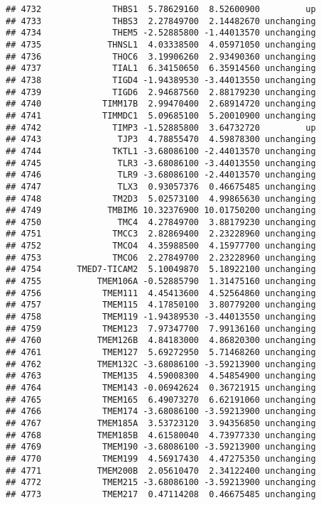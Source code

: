 \documentclass[]{article}
\begin{document}
\begin{verbatim}
## 4732              THBS1  5.78629160  8.52600900         up
## 4733              THBS3  2.27849700  2.14482670 unchanging
## 4734              THEM5 -2.52885800 -1.44013570 unchanging
## 4735             THNSL1  4.03338500  4.05971050 unchanging
## 4736              THOC6  3.19906260  2.93490360 unchanging
## 4737              TIAL1  6.34150650  6.35914560 unchanging
## 4738              TIGD4 -1.94389530 -3.44013550 unchanging
## 4739              TIGD6  2.94687560  2.88179230 unchanging
## 4740            TIMM17B  2.99470400  2.68914720 unchanging
## 4741            TIMMDC1  5.09685100  5.20010900 unchanging
## 4742              TIMP3 -1.52885800  3.64732720         up
## 4743               TJP3  4.78855470  4.59878300 unchanging
## 4744              TKTL1 -3.68086100 -2.44013570 unchanging
## 4745               TLR3 -3.68086100 -3.44013550 unchanging
## 4746               TLR9 -3.68086100 -2.44013570 unchanging
## 4747               TLX3  0.93057376  0.46675485 unchanging
## 4748              TM2D3  5.02573100  4.99865630 unchanging
## 4749             TMBIM6 10.32376900 10.01750200 unchanging
## 4750               TMC4  4.27849700  3.88179230 unchanging
## 4751              TMCC3  2.82869400  2.23228960 unchanging
## 4752              TMCO4  4.35988500  4.15977700 unchanging
## 4753              TMCO6  2.27849700  2.23228960 unchanging
## 4754       TMED7-TICAM2  5.10049870  5.18922100 unchanging
## 4755           TMEM106A -0.52885790  1.31475160 unchanging
## 4756            TMEM111  4.45413600  4.52564860 unchanging
## 4757            TMEM115  4.17850100  3.80779200 unchanging
## 4758            TMEM119 -1.94389530 -3.44013550 unchanging
## 4759            TMEM123  7.97347700  7.99136160 unchanging
## 4760           TMEM126B  4.84183000  4.86820300 unchanging
## 4761            TMEM127  5.69272950  5.71468260 unchanging
## 4762           TMEM132C -3.68086100 -3.59213900 unchanging
## 4763            TMEM135  4.59008300  4.54854900 unchanging
## 4764            TMEM143 -0.06942624  0.36721915 unchanging
## 4765            TMEM165  6.49073270  6.62191060 unchanging
## 4766            TMEM174 -3.68086100 -3.59213900 unchanging
## 4767           TMEM185A  3.53723120  3.94356850 unchanging
## 4768           TMEM185B  4.61580040  4.73977330 unchanging
## 4769            TMEM190 -3.68086100 -3.59213900 unchanging
## 4770            TMEM199  4.56917430  4.47275350 unchanging
## 4771           TMEM200B  2.05610470  2.34122400 unchanging
## 4772            TMEM215 -3.68086100 -3.59213900 unchanging
## 4773            TMEM217  0.47114208  0.46675485 unchanging

\end{verbatim}
\end{document}
